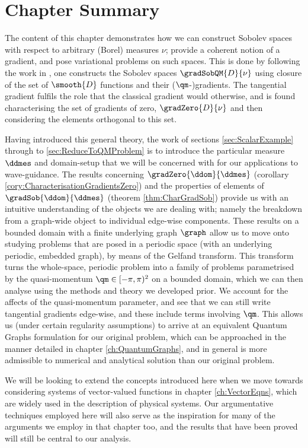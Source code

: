 \section{Chapter Summary}
The content of this chapter demonstrates how we can construct Sobolev spaces with respect to arbitrary (Borel) measures $\nu$; provide a coherent notion of a gradient, and pose variational problems on such spaces.
This is done by following the work in \cite{zhikov2000extension}, one constructs the Sobolev spaces $\gradSobQM{D}{\nu}$ using closure of the set of $\smooth{D}$ functions and their ($\qm$-)gradients.
The tangential gradient fulfils the role that the classical gradient would otherwise, and is found characterising the set of gradients of zero, $\gradZero{D}{\nu}$ and then considering the elements orthogonal to this set. \newline

Having introduced this general theory, the work of sections \ref{sec:ScalarExample} through to \ref{sec:ReduceToQMProblem} is to introduce the particular measure $\ddmes$ and domain-setup that we will be concerned with for our applications to wave-guidance.
The results concerning $\gradZero{\ddom}{\ddmes}$ (corollary \ref{cory:CharacterisationGradientsZero}) and the properties of elements of $\gradSob{\ddom}{\ddmes}$ (theorem \ref{thm:CharGradSob}) provide us with an intuitive understanding of the objects we are dealing with; namely the breakdown from a graph-wide object to individual edge-wise components.
These results on a bounded domain with a finite underlying graph $\graph$ allow us to move onto studying problems that are posed in a periodic space (with an underlying periodic, embedded graph), by means of the Gelfand transform.
This transform turns the whole-space, periodic problem into a family of problems parametrised by the quasi-momentum $\qm\in[-\pi,\pi)^2$ on a bounded domain, which we can then analyse using the methods and theory we developed prior.
We account for the affects of the quasi-momentum parameter, and see that we can still write tangential gradients edge-wise, and these include terms involving $\qm$.
This allows us (under certain regularity assumptions) to arrive at an equivalent Quantum Graphs formulation for our original problem, which can be approached in the manner detailed in chapter \ref{ch:QuantumGraphs}, and in general is more admissible to numerical and analytical solution than our original problem. \newline

We will be looking to extend the concepts introduced here when we move towards considering systems of vector-valued functions in chapter \ref{ch:VectorEqns}, which are widely used in the description of physical systems.
Our argumentative techniques employed here will also serve as the inspiration for many of the arguments we employ in that chapter too, and the results that have been proved will still be central to our analysis.